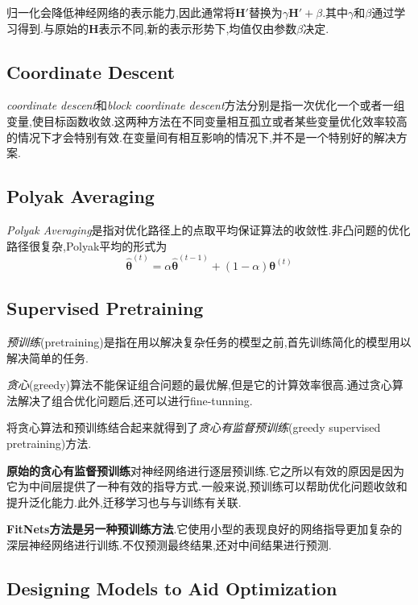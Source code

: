 归一化会降低神经网络的表示能力,因此通常将$\bm H'$替换为$\gamma\bm H'+\beta$.其中$\gamma$和$\beta$通过学习得到.与原始的$\bm H$表示不同,新的表示形势下,均值仅由参数$\beta$决定.

\subsection{Coordinate Descent}

\textit{coordinate descent}和\textit{block coordinate descent}方法分别是指一次优化一个或者一组变量,使目标函数收敛.这两种方法在不同变量相互孤立或者某些变量优化效率较高的情况下才会特别有效.在变量间有相互影响的情况下,并不是一个特别好的解决方案.

\subsection{Polyak Averaging}

\textit{Polyak Averaging}是指对优化路径上的点取平均保证算法的收敛性.非凸问题的优化路径很复杂,Polyak平均的形式为
\begin{equation}
\hat{\bm\theta}^{(t)}=\alpha\hat{\bm\theta}^{(t-1)}+(1-\alpha)\bm\theta^{(t)}
\end{equation}

\subsection{Supervised Pretraining}

\textit{预训练}(pretraining)是指在用以解决复杂任务的模型之前,首先训练简化的模型用以解决简单的任务.

\textit{贪心}(greedy)算法不能保证组合问题的最优解,但是它的计算效率很高.通过贪心算法解决了组合优化问题后,还可以进行fine-tunning.

将贪心算法和预训练结合起来就得到了\textit{贪心有监督预训练}(greedy supervised pretraining)方法.

\textbf{原始的贪心有监督预训练}对神经网络进行逐层预训练.它之所以有效的原因是因为它为中间层提供了一种有效的指导方式.一般来说,预训练可以帮助优化问题收敛和提升泛化能力.此外,迁移学习也与与训练有关联.

\textbf{FitNets方法是另一种预训练方法}.它使用小型的表现良好的网络指导更加复杂的深层神经网络进行训练.不仅预测最终结果,还对中间结果进行预测.

\subsection{Designing Models to Aid Optimization}

